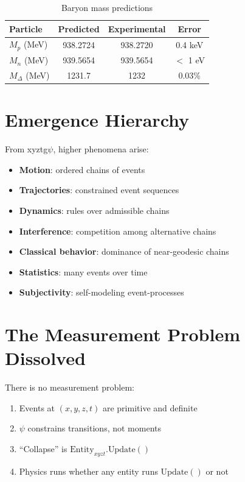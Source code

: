\documentclass[aps,prl,twocolumn,showpacs,superscriptaddress,groupedaddress]{revtex4-2}
\begin{document}
\begin{table}[h]
\caption{Baryon mass predictions}
\begin{tabular}{lccc}
\hline
Particle & Predicted & Experimental & Error \\
\hline
$M_p$ (MeV) & 938.2724 & 938.2720 & 0.4 keV \\
$M_n$ (MeV) & 939.5654 & 939.5654 & $<$ 1 eV \\
$M_\Delta$ (MeV) & 1231.7 & 1232 & 0.03\% \\
\hline
\end{tabular}
\end{table}

\section{Emergence Hierarchy}

From xyztg$\psi$, higher phenomena arise:

\begin{itemize}
\item \textbf{Motion}: ordered chains of events
\item \textbf{Trajectories}: constrained event sequences
\item \textbf{Dynamics}: rules over admissible chains
\item \textbf{Interference}: competition among alternative chains
\item \textbf{Classical behavior}: dominance of near-geodesic chains
\item \textbf{Statistics}: many events over time
\item \textbf{Subjectivity}: self-modeling event-processes
\end{itemize}

\section{The Measurement Problem Dissolved}

There is no measurement problem:
\begin{enumerate}
\item Events at $(x,y,z,t)$ are primitive and definite
\item $\psi$ constrains transitions, not moments
\item ``Collapse'' is $\text{Entity}_{xyzt}.\text{Update}()$
\item Physics runs whether any entity runs $\text{Update}()$ or not
\end{enumerate}
\end{document}

